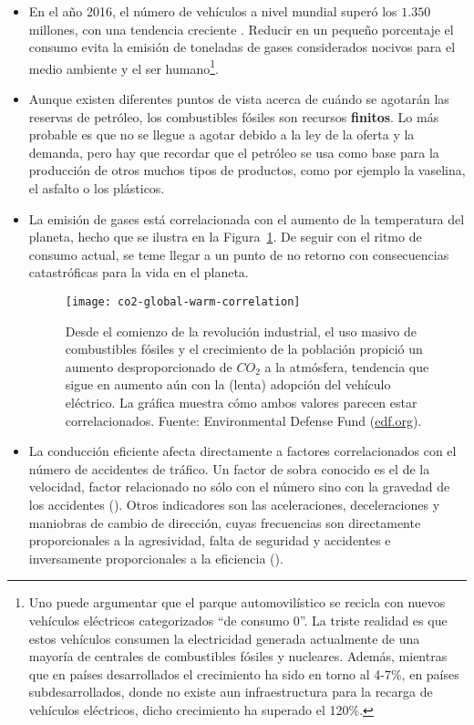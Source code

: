 \begin{itemize}
	\item En el año 2016, el número de vehículos a nivel mundial superó los $1.350$ millones, con una tendencia creciente \cite{oica2014motrate}. Reducir en un pequeño porcentaje el consumo evita la emisión de toneladas de gases considerados nocivos para el medio ambiente y el ser humano\footnote{Uno puede argumentar que el parque automovilístico se recicla con nuevos vehículos eléctricos categorizados \enquote{de consumo 0}. La triste realidad es que estos vehículos consumen la electricidad generada actualmente de una mayoría de centrales de combustibles fósiles y nucleares. Además, mientras que en países desarrollados el crecimiento ha sido en torno al 4-7\%, en países subdesarrollados, donde no existe aun infraestructura para la recarga de vehículos eléctricos, dicho crecimiento ha superado el 120\%.}.
	\item Aunque existen diferentes puntos de vista acerca de cuándo se agotarán las reservas de petróleo, los combustibles fósiles son recursos \textbf{finitos}. Lo más probable es que no se llegue a agotar debido a la ley de la oferta y la demanda, pero hay que recordar que el petróleo se usa como base para la producción de otros muchos tipos de productos, como por ejemplo la vaselina, el asfalto o los plásticos.
	\item La emisión de gases está correlacionada con el aumento de la temperatura del planeta, hecho que se ilustra en la Figura~\ref{fig:co2-global-warm-correlation}. De seguir con el ritmo de consumo actual, se teme llegar a un punto de no retorno con consecuencias catastróficas para la vida en el planeta.

\begin{figure}[t]
	\centering
	\texttt{[image: co2-global-warm-correlation]}
	\caption[Relación entre la emisión de $CO_2$ a la atmósfera y el aumento de la temperatura en el planeta los últimos $1000$ años]{Desde el comienzo de la revolución industrial, el uso masivo de combustibles fósiles y el crecimiento de la población propició un aumento desproporcionado de $CO_2$ a la atmósfera, tendencia que sigue en aumento aún con la (lenta) adopción del vehículo eléctrico. La gráfica muestra cómo ambos valores parecen estar correlacionados. Fuente: Environmental Defense Fund (\url{edf.org}).}
	\label{fig:co2-global-warm-correlation}
\end{figure}

	\item La conducción eficiente afecta directamente a factores correlacionados con el número de accidentes de tráfico. Un factor de sobra conocido es el de la velocidad, factor relacionado no sólo con el número sino con la gravedad de los accidentes (\cite{imprialou2016re}). Otros indicadores son las aceleraciones, deceleraciones y maniobras de cambio de dirección, cuyas frecuencias son directamente proporcionales a la agresividad, falta de seguridad y accidentes e inversamente proporcionales a la eficiencia (\cite{dingus2006100, lerner2010exploration}).
\end{itemize}

